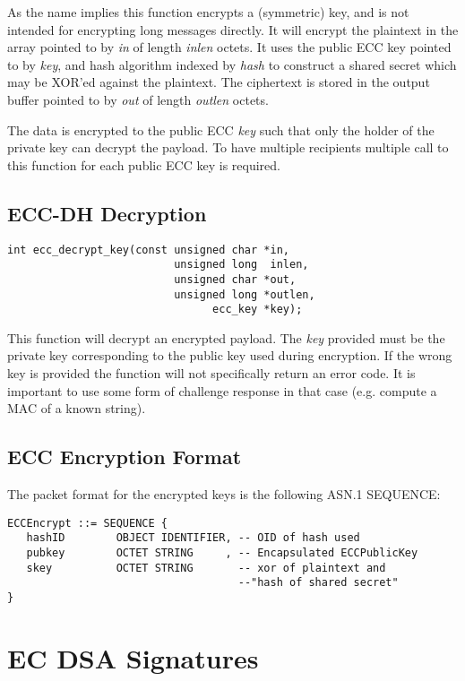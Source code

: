 \documentclass[synpaper]{book}
\newcommand{\mysection}[1]    %
	{                   %
	\section{#1}
   \markboth{\textsf{www.libtom.org}}{\thesection ~ {#1}}
	}
\begin{document}
As the name implies this function encrypts a (symmetric) key, and is not intended for encrypting long messages directly.  It will encrypt the 
plaintext in the array pointed to by \textit{in} of length \textit{inlen} octets.  It uses the public ECC key pointed to by \textit{key}, and
hash algorithm indexed by \textit{hash} to construct a shared secret which may be XOR'ed against the plaintext.  The ciphertext is stored in
the output buffer pointed to by \textit{out} of length \textit{outlen} octets.

The data is encrypted to the public ECC \textit{key} such that only the holder of the private key can decrypt the payload.  To have multiple 
recipients multiple call to this function for each public ECC key is required.

\subsection{ECC-DH Decryption}
\begin{verbatim}
int ecc_decrypt_key(const unsigned char *in, 
                          unsigned long  inlen,
                          unsigned char *out, 
                          unsigned long *outlen, 
                                ecc_key *key);
\end{verbatim}

This function will decrypt an encrypted payload.  The \textit{key} provided must be the private key corresponding to the public key
used during encryption.  If the wrong key is provided the function will not specifically return an error code.  It is important
to use some form of challenge response in that case (e.g. compute a MAC of a known string).

\subsection{ECC Encryption Format}
The packet format for the encrypted keys is the following ASN.1 SEQUENCE:

\begin{verbatim}
ECCEncrypt ::= SEQUENCE {
   hashID        OBJECT IDENTIFIER, -- OID of hash used
   pubkey        OCTET STRING     , -- Encapsulated ECCPublicKey
   skey          OCTET STRING       -- xor of plaintext and 
                                    --"hash of shared secret"
}
\end{verbatim}

\mysection{EC DSA Signatures}
\end{document}
